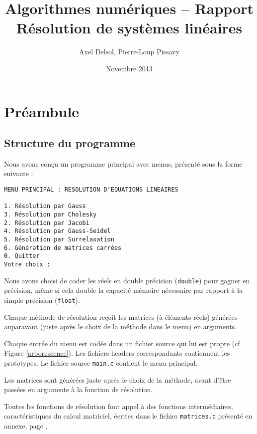 \documentclass{report}
\title{Algorithmes numériques -- Rapport \\ \vspace{0.5cm}Résolution de systèmes linéaires}
\author{Axel Delsol, Pierre-Loup Pissavy}
\date{Novembre 2013}
\begin{document}
  \maketitle
  \tableofcontents

  \chapter{Préambule}
  	\section{Structure du programme}
    Nous avons conçu un programme principal avec menus, présenté sous la forme suivante :

    \begin{lstlisting}[style=apercu, name=Menu Principal]
MENU PRINCIPAL : RESOLUTION D'EQUATIONS LINEAIRES

1. Résolution par Gauss
3. Résolution par Cholesky
2. Résolution par Jacobi
4. Résolution par Gauss-Seidel
5. Résolution par Surrelaxation
6. Génération de matrices carrées
0. Quitter
Votre choix : 
	\end{lstlisting}
	
	Nous avons choisi de coder les réels en double précision (\verb"double") pour gagner en précision, même si cela double la capacité mémoire nécessaire par rapport à la simple précision (\verb"float").
    \vspace{0.3cm}
    
    Chaque méthode de résolution reçoit les matrices (à éléments réels) générées auparavant (juste après le choix de la méthode dans le menu) en arguments.
    \vspace{0.3cm}
    	
	Chaque entrée du menu est codée dans un fichier source qui lui est propre (cf Figure \ref{arborescence}). Les fichiers headers correspondants contiennent les prototypes. Le fichier source \verb"main.c" contient le menu principal.
	\vspace{0.3cm}
	
    Les matrices sont générées juste après le choix de la méthode, avant d'être passées en arguments à la fonction de résolution.

    
    \vspace{0.3cm}

  Toutes les fonctions de résolution font appel à des fonctions intermédiaires, caractéristiques du calcul matriciel, écrites dans le fichier \verb"matrices.c" présenté en annexe, page \pageref{sourceMatrices}.
  
\end{document}
